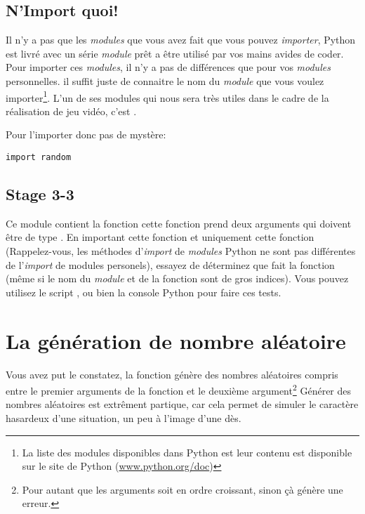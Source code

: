 \subsection{N'Import quoi!}

Il n'y a pas que les \emph{modules} que vous avez fait que vous pouvez \emph{importer}, Python est livré avec un série \emph{module} prêt a être utilisé par vos mains avides de coder.
Pour importer ces \emph{modules}, il n'y a pas de différences que pour vos \emph{modules} personnelles. il suffit juste de connaitre le nom du \emph{module} que vous voulez importer\footnote{La liste des modules disponibles dans Python est leur contenu est disponible sur le site de Python (\url{www.python.org/doc})}. L'un de ses modules qui nous sera très utiles dans le cadre de la réalisation de jeu vidéo, c'est .

Pour l'importer donc pas de mystère:

\begin{lstlisting}
import random
\end{lstlisting}

\subsection{Stage 3-3}
Ce module contient la fonction  cette fonction prend deux arguments qui doivent être de type .
En important cette fonction et uniquement cette fonction (Rappelez-vous, les méthodes d'\emph{import} de \emph{modules} Python ne sont pas différentes de l'\emph{import} de modules personels), essayez de déterminez que fait la fonction (même si le nom du \emph{module} et de la fonction sont de gros indices).
Vous pouvez utilisez le script , ou bien la console Python pour faire ces tests.

\section{La génération de nombre aléatoire}

Vous avez put le constatez, la fonction  génère des nombres aléatoires compris entre le premier arguments de la fonction et le deuxième argument\footnote{Pour autant que les arguments soit en ordre croissant, sinon çà génère une erreur.}
Générer des nombres aléatoires est extrêment partique, car cela permet de simuler le caractère hasardeux d'une situation, un peu à l'image d'une dès.

